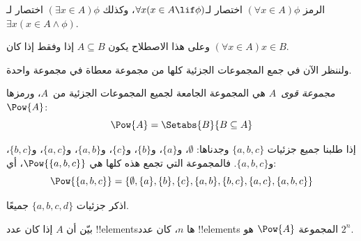 \documentclass[../../../include/open-logic-section]{subfiles}
\begin{document}
\begin{defn}
الرمز $(\forall x \in A)\phi$ اختصار لـ$\forall x(x \in A \lif
\phi)$، وكذلك $(\exists x \in A)\phi$ اختصار لـ$\exists x(x
\in A \land \phi)$.
\end{defn}

وعلى هذا الاصطلاح يكون $A \subseteq B$ إذا وفقط إذا كان $(\forall
x \in A)x \in B$.

ولننظر الآن في جمع المجموعات الجزئية كلها من مجموعة معطاة في مجموعة واحدة.

\begin{defn}
\emph{مجموعة قوى}~$A$ هي المجموعة الجامعة لجميع المجموعات الجزئية
من~$A$، ورمزها $\Pow{A}$:
  \[
    \Pow{A} = \Setabs{B}{B \subseteq A}
  \]
\end{defn}

\begin{ex}
إذا طلبنا جميع جزئيات $\{ a, b, c \}$ وجدناها:
$\emptyset$، و$\{a \}$، و$\{b\}$، و$\{c\}$، و$\{a, b\}$، و$\{a, c\}$، و$\{b,
c\}$، و$\{a, b, c\}$. فالمجموعة التي تجمع هذه كلها هي
$\Pow{\{a,b,c\}}$، أي:
\[
\Pow{\{ a, b, c \}} = \{\emptyset, \{a \}, \{b\}, \{c\}, \{a, b\},
\{b, c\}, \{a, c\}, \{a, b, c\}\}
\]
\end{ex}

\begin{prob}
اذكر جزئيات $\{a, b, c, d\}$ جميعًا.
\end{prob}

\begin{prob}
بيّن أن $A$ إذا كان عدد !!{element}sها $n$، كان عدد !!{element}s
المجموعة $\Pow{A}$ هو $2^n$.
\end{prob}
\end{document}
